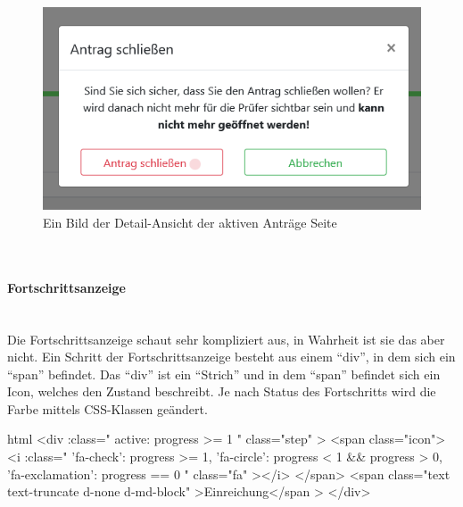 \begin{figure}[H]
	\centering
	\includegraphics[width=0.6\linewidth]{images/website/antrag_schliessen}
	\caption[Aktiv]{Ein Bild der Detail-Ansicht der aktiven Anträge Seite}
	\label{fig:antragaktivdetail}
\end{figure}

~\\
\paragraph{Fortschrittsanzeige}
~\\
Die Fortschrittsanzeige schaut sehr kompliziert aus, in Wahrheit ist sie das aber nicht. Ein Schritt der Fortschrittsanzeige besteht aus einem \enquote{div}, in dem sich ein \enquote{span} befindet. Das \enquote{div} ist ein \enquote{Strich} und in dem \enquote{span} befindet sich ein Icon, welches den Zustand beschreibt. Je nach Status des Fortschritts wird die Farbe mittels CSS-Klassen geändert.
\begin{code}{html}
	<div
            :class="{
              active: progress >= 1
            }"
            class="step"
          >
            <span class="icon">
              <i
                :class="{
                  'fa-check': progress >= 1,
                  'fa-circle': progress < 1 && progress > 0,
                  'fa-exclamation': progress == 0
                }"
                class="fa"
              ></i>
            </span>
            <span class="text text-truncate d-none d-md-block"
              >Einreichung</span
            >
          </div>
\end{code}
	\label{list:codeprogress} ~\\

	\label{list:progresscolor} ~\\

